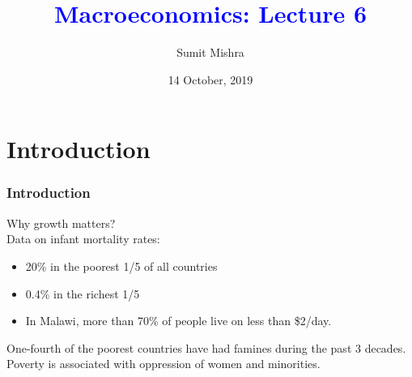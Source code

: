\documentclass[shownotes,11pt, aspectratio=169]{beamer}
\title[]{\textcolor{blue}{Macroeconomics: Lecture 6}}
\author[SM]{Sumit Mishra}
\institute[IFMR]{\small{\begin{tabular}{c}
IFMR, Sri City \\
\end{tabular}}}
\date{14 October, 2019}
\begin{document}
\section{Introduction}
\begin{frame}
\titlepage %
\end{frame}


\begin{frame}
\frametitle{Introduction}
Why growth matters? \\
Data on infant mortality rates:
\begin{itemize}
 \item 20\% in the poorest 1/5 of all countries
  \item 0.4\% in the richest 1/5
   \item In Malawi, more than 70\% of people live on less than \$2/day.
\end{itemize}   
One-fourth of the poorest countries have had
famines during the past 3 decades. \\
Poverty is associated with oppression of women
and minorities.
\end{frame}
\end{document}
